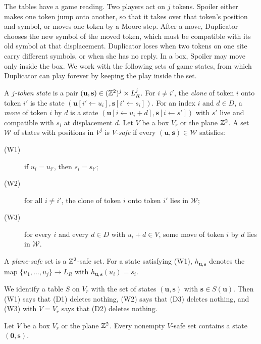 The tables have a game reading. Two players act on $j$ tokens. Spoiler either makes one token jump onto another, so that it takes over that token's position and symbol, or moves one token by a Moore step. After a move, Duplicator chooses the new symbol of the moved token, which must be compatible with its old symbol at that displacement. Duplicator loses when two tokens on one site carry different symbols, or when she has no reply. In a box, Spoiler may move only inside the box. We work with the following sets of game states, from which Duplicator can play forever by keeping the play inside the set.

\begin{definition}\label{set:def-safe}
A \emph{$j$-token state} is a pair $(\mathbf u,\mathbf s)\in(\mathbb{Z}^2)^j\times L_R^j$. For $i\ne i'$, the \emph{clone} of token $i$ onto token $i'$ is the state $(\mathbf u[i'\leftarrow u_i],\mathbf s[i'\leftarrow s_i])$. For an index $i$ and $d\in D$, a \emph{move} of token $i$ by $d$ is a state $(\mathbf u[i\leftarrow u_i+d],\mathbf s[i\leftarrow s'])$ with $s'$ live and compatible with $s_i$ at displacement $d$. Let $V$ be a box $V_r$ or the plane $\mathbb{Z}^2$. A set $\mathcal W$ of states with positions in $V^j$ is \emph{$V$-safe} if every $(\mathbf u,\mathbf s)\in\mathcal W$ satisfies:
\begin{description}
\item[(W1)] if $u_i=u_{i'}$, then $s_i=s_{i'}$;
\item[(W2)] for all $i\ne i'$, the clone of token $i$ onto token $i'$ lies in $\mathcal W$;
\item[(W3)] for every $i$ and every $d\in D$ with $u_i+d\in V$, some move of token $i$ by $d$ lies in $\mathcal W$.
\end{description}
A \emph{plane-safe} set is a $\mathbb{Z}^2$-safe set. For a state satisfying (W1), $h_{\mathbf u,\mathbf s}$ denotes the map $\{u_1,\dots,u_j\}\to L_R$ with $h_{\mathbf u,\mathbf s}(u_i)=s_i$.
\end{definition}

We identify a table $S$ on $V_r$ with the set of states $(\mathbf u,\mathbf s)$ with $\mathbf s\in S(\mathbf u)$. Then (W1) says that (D1) deletes nothing, (W2) says that (D3) deletes nothing, and (W3) with $V=V_r$ says that (D2) deletes nothing.

\begin{lemma}\label{set:walk}
Let $V$ be a box $V_r$ or the plane $\mathbb{Z}^2$. Every nonempty $V$-safe set contains a state $(\mathbf 0,\mathbf s)$.
\end{lemma}

